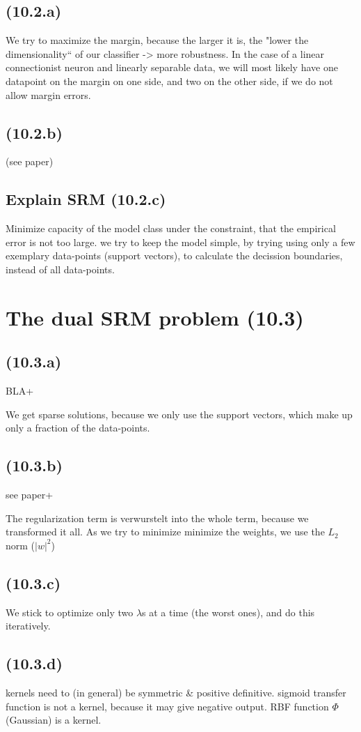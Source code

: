 \documentclass[a4paper,headings=small]{scrartcl}
\begin{document}
\subsection{ (10.2.a)}
We try to maximize the margin, because the larger it is, the "lower the dimensionality`` of our classifier -> more robustness.
In the case of a linear connectionist neuron and linearly separable data,
we will most likely have one datapoint on the margin on one side,
and two on the other side,
if we do not allow margin errors.

\subsection{ (10.2.b)}

(see paper)

\subsection{Explain SRM (10.2.c)}
Minimize capacity of the model class under the constraint,
that the empirical error is not too large.
we try to keep the model simple, by trying using only
a few exemplary data-points (support vectors),
to calculate the decission boundaries, instead of all data-points.


\section{The dual SRM problem (10.3)}

\subsection{ (10.3.a)}

BLA+

We get sparse solutions, because we only use the support vectors,
which make up only a fraction of the data-points.

\subsection{ (10.3.b)}

see paper+

The regularization term is verwurstelt into the whole term, because we transformed it all.
As we try to minimize minimize the weights, we use the $L_2$ norm ($|w|^2$)

\subsection{ (10.3.c)}
We stick to optimize only two $\lambda$s at a time (the worst ones),
and do this iteratively.

\subsection{ (10.3.d)}
kernels need to (in general) be symmetric \& positive definitive.
sigmoid transfer function is not a kernel, because it may give negative output.
RBF function $\Phi$ (Gaussian) is a kernel.
\end{document}
